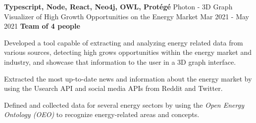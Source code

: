\cventry
  {\textbf{Typescript, Node, React, Neo4j, OWL, Protégé}}
  {Photon - 3D Graph Visualizer of High Growth Opportunities on the Energy Market \href{https://github.com/EduRibeiro00/Photon-feup-lapd}{\faExternalLink}} %
  {Mar 2021 - May 2021}
  {\textbf{Team of 4 people}}
  {
    \begin{cvitems} %
      \item {Developed a tool capable of extracting and analyzing energy related data from various sources, detecting high grows opportunities within the energy market and industry, and showcase that information to the user in a 3D graph interface.}
      \item {Extracted the most up-to-date news and information about the energy market by using the Usearch API and social media APIs from Reddit and Twitter.}
      \item {Defined and collected data for several energy sectors by using the \textit{Open Energy Ontology (OEO)} \href{https://openenergy-platform.org/ontology/}{\faExternalLink} to recognize energy-related areas and concepts.}
    \end{cvitems}
  }